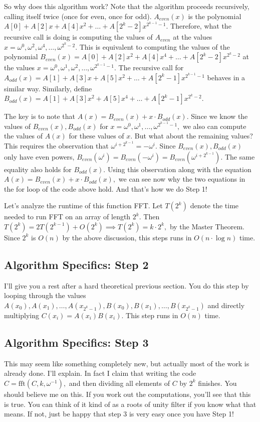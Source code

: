So why does this algorithm work? Note that the algorithm proceeds recursively, calling itself twice (once for even, once for odd). $A_{even}(x)$ is the polynomial $A[0] + A[2]x + A[4]x^2 + \dots + A[2^k-2]x^{2^{k-1}-1}.$ Therefore, what the recursive call is doing is computing the values of $A_{even}$ at the values $x = \omega^0, \omega^2, \omega^4, \dots, \omega^{2^k-2}.$ This is equivalent to computing the values of the polynomial $B_{even}(x) = A[0] + A[2]x^2 + A[4]x^4 + \dots + A[2^k-2]x^{2^{k}-2}$ at the values $x = \omega^0, \omega^1, \omega^2, \dots, \omega^{2^{k-1}-1}.$ The recursive call for $A_{odd}(x) = A[1] + A[3]x + A[5]x^2 + \dots + A[2^k-1]x^{2^{k-1}-1}$ behaves in a similar way. Similarly, define $B_{odd}(x) = A[1] + A[3]x^2 + A[5]x^4 + \dots + A[2^k-1]x^{2^{k}-2}.$

The key is to note that $A(x) = B_{even}(x) + x \cdot B_{odd}(x).$ Since we know the values of $B_{even}(x), B_{odd}(x)$ for $x = \omega^0, \omega^1, \dots, \omega^{2^{k-1}-1},$ we also can compute the values of $A(x)$ for these values of $x$. But what about the remaining values? This requires the observation that $\omega^{i + 2^{k-1}} = -\omega^i.$ Since $B_{even}(x), B_{odd}(x)$ only have even powers, $B_{even}(\omega^i) = B_{even}(-\omega^i) = B_{even}(\omega^{i + 2^{k-1}}).$ The same equality also holds for $B_{odd}(x).$ Using this observation along with the equation $A(x) = B_{even}(x) + x \cdot B_{odd}(x),$ we can see now why the two equations in the for loop of the code above hold. And that's how we do Step 1!

Let's analyze the runtime of this function FFT. Let $T(2^k)$ denote the time needed to run FFT on an array of length $2^k.$ Then $T(2^k) = 2T(2^{k-1}) + O(2^k) \implies T(2^k) = k \cdot 2^k,$ by the Master Theorem. Since $2^k$ is $O(n)$ by the above discussion, this steps runs in $O(n \cdot \log n)$ time.

\subsection{Algorithm Specifics: Step 2}

I'll give you a rest after a hard theoretical previous section. You do this step by looping through the values $A(x_0), A(x_1), \dots, A(x_{2^k-1}), B(x_0), B(x_1), \dots, B(x_{2^k-1})$ and directly multiplying $C(x_i) = A(x_i)B(x_i).$ This step runs in $O(n)$ time.

\subsection{Algorithm Specifics: Step 3}

This may seem like something completely new, but actually most of the work is already done. I'll explain. In fact I claim that writing the code $C = \text{fft}(C, k, \omega^{-1}),$ and then dividing all elements of $C$ by $2^k$ finishes. You should believe me on this. If you work out the computations, you'll see that this is true. You can think of it kind of as a roots of unity filter if you know what that means. If not, just be happy that step 3 is very easy once you have Step 1!